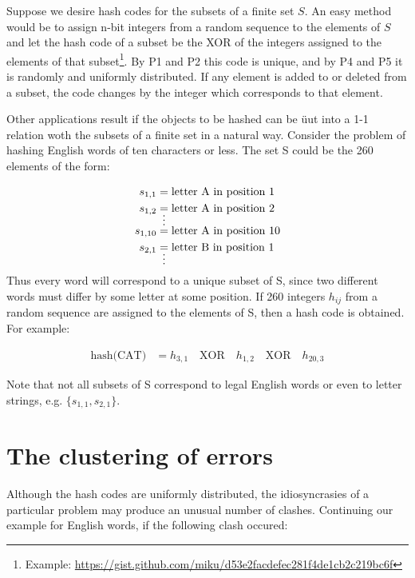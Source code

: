 \documentclass{article}
\begin{document}
Suppose we desire hash codes for the subsets of a finite set $S$. An easy
method would be to assign n-bit integers from a random sequence to the elements
of $S$ and let the hash code of a subset be the XOR of the integers assigned to
the elements of that subset\footnote{Example:
\url{https://gist.github.com/miku/d53e2facdefec281f4de1cb2c219bc6f}}. By P1
and P2 this code is unique, and by P4 and P5 it is randomly and uniformly
distributed. If any element is added to or deleted from a subset, the code
changes by the integer which corresponds to that element.

Other applications result if the objects to be hashed can be üut into a 1-1
relation woth the subsets of a finite set in a natural way. Consider the
problem of hashing English words of ten characters or less. The set S could be
the 260 elements of the form:

\begin{align*}
s_{1,1} &= \text{letter A in position 1} \\
s_{1,2} &= \text{letter A in position 2} \\
&\shortvdotswithin{=}
s_{1,10} &= \text{letter A in position 10} \\
s_{2,1} &= \text{letter B in position 1} \\
&\shortvdotswithin{=}
\end{align*}

Thus every word will correspond to a unique subset of S, since two different
words must differ by some letter at some position. If 260 integers $h_{ij}$
from a random sequence are assigned to the elements of S, then a hash code is
obtained. For example:

\begin{align*}
\text{hash(CAT)} &= h_{3,1} \quad \text{XOR} \quad h_{1,2} \quad \text{XOR} \quad h_{20,3}
\end{align*}

Note that not all subsets of S correspond to legal English words or even to letter strings, e.g. $\{s_{1,1}, s_{2,1}\}$.

\section*{The clustering of errors}

Although the hash codes are uniformly distributed, the idiosyncrasies of a
particular problem may produce an unusual number of clashes. Continuing our
example for English words, if the following clash occured:
\end{document}
